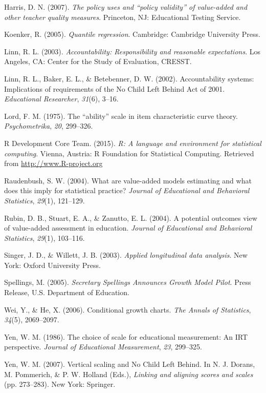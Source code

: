 \documentclass[12pt]{article}
\begin{document}
Harris, D. N. (2007). \emph{The policy uses and ``policy validity'' of
value-added and other teacher quality measures}. Princeton, NJ:
Educational Testing Service.

Koenker, R. (2005). \emph{Quantile regression}. Cambridge: Cambridge
University Press.

Linn, R. L. (2003). \emph{Accountability: Responsibility and reasonable
expectations}. Los Angeles, CA: Center for the Study of Evaluation,
CRESST.

Linn, R. L., Baker, E. L., \& Betebenner, D. W. (2002). Accountability
systems: Implications of requirements of the No Child Left Behind Act of
2001. \emph{Educational Researcher}, \emph{31}(6), 3--16.

Lord, F. M. (1975). The ``ability'' scale in item characteristic curve
theory. \emph{Psychometrika}, \emph{20}, 299--326.

R Development Core Team. (2015). \emph{R: A language and environment for
statistical computing}. Vienna, Austria: R Foundation for Statistical
Computing. Retrieved from \url{http://www.R-project.org}

Raudenbush, S. W. (2004). What are value-added models estimating and
what does this imply for statistical practice? \emph{Journal of
Educational and Behavioral Statistics}, \emph{29}(1), 121--129.

Rubin, D. B., Stuart, E. A., \& Zanutto, E. L. (2004). A potential
outcomes view of value-added assessment in education. \emph{Journal of
Educational and Behavioral Statistics}, \emph{29}(1), 103--116.

Singer, J. D., \& Willett, J. B. (2003). \emph{Applied longitudinal data
analysis}. New York: Oxford University Press.

Spellings, M. (2005). \emph{Secretary Spellings Announces Growth Model
Pilot}. Press Release, U.S. Department of Education.

Wei, Y., \& He, X. (2006). Conditional growth charts. \emph{The Annals
of Statistics}, \emph{34}(5), 2069--2097.

Yen, W. M. (1986). The choice of scale for educational measurement: An
IRT perspective. \emph{Journal of Educational Measurement}, \emph{23},
299--325.

Yen, W. M. (2007). Vertical scaling and No Child Left Behind. In N. J.
Dorans, M. Pommerich, \& P. W. Holland (Eds.), \emph{Linking and
aligning scores and scales} (pp. 273--283). New York: Springer.



\end{document}
